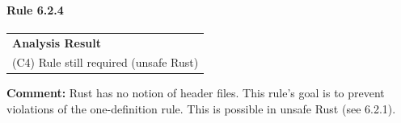 \paragraph{Rule 6.2.4}
\begin{longtable}{p{13cm}}
\textbf{Analysis Result} \\
(C4) Rule still required (unsafe Rust) \\
\end{longtable}
\textbf{Comment:} Rust has no notion of header files. This rule's goal is to prevent violations of the one-definition rule. This is possible in unsafe Rust (see 6.2.1). \\
